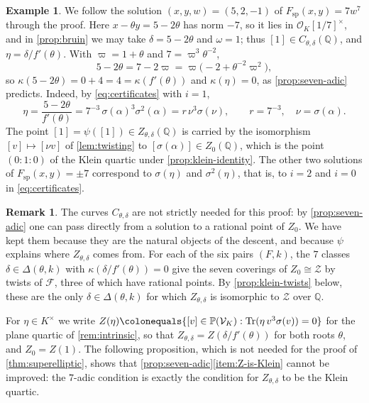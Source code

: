 \documentclass[12pt]{amsart}
\newcommand{\PP}{{\mathbb P}}
\newcommand{\Q}{\mathbb{Q}}
\newcommand{\calF}{{\mathcal F}}
\newcommand{\calV}{{\mathcal V}}
\newcommand{\calZ}{{\mathcal Z}}
\newcommand{\OO}{{\mathcal O}}
\DeclareMathOperator{\spc}{sp}
\DeclareMathOperator{\Tr}{Tr}
\numberwithin{equation}{section}
\theoremstyle{definition}
\newtheorem{example}[theorem]{Example}
\newtheorem{remark}[theorem]{Remark}
\begin{document}
\begin{example}
  \label{ex:five-two}
  We follow the solution $(x,y,w) = (5,2,-1)$ of $F_{\spc}(x,y) = 7w^{7}$ through
  the proof. Here $x - \theta y = 5 - 2\theta$ has norm $-7$, so it lies in
  $\OO_K[1/7]^{\times}$, and in \cref{prop:bruin} we may take $\delta = 5 - 2\theta$ and
  $\omega = 1$; thus $[1] \in C_{\theta,\delta}(\Q)$, and $\eta = \delta/f'(\theta)$.
  With $\varpi = 1 + \theta$ and $7 = \varpi^{3}\theta^{-2}$,
  \[
    5 - 2\theta = 7 - 2\varpi = \varpi\bigl(-2 + \theta^{-2}\varpi^{2}\bigr),
  \]
  so $\kappa(5 - 2\theta) = 0 + 4 = 4 = \kappa(f'(\theta))$ and $\kappa(\eta) = 0$,
  as \cref{prop:seven-adic} predicts. Indeed, by \cref{eq:certificates} with
  $i = 1$,
  \[
    \eta = \frac{5 - 2\theta}{f'(\theta)} = 7^{-3}\,\sigma(\alpha)^{3}\sigma^{2}(\alpha)
    = r\,\nu^{3}\sigma(\nu), \qquad r = 7^{-3},\quad \nu = \sigma(\alpha).
  \]
  The point $[1] = \psi([1]) \in Z_{\theta,\delta}(\Q)$ is carried by the
  isomorphism $[v] \mapsto [\nu v]$ of \cref{lem:twisting} to $[\sigma(\alpha)]
  \in Z_0(\Q)$, which is the point $(0:1:0)$ of the Klein quartic under
  \cref{prop:klein-identity}. The other two solutions of $F_{\spc}(x,y) = \pm 7$
  correspond to $\sigma(\eta)$ and $\sigma^{2}(\eta)$, that is, to $i = 2$ and
  $i = 0$ in \cref{eq:certificates}.
\end{example}

\begin{remark}
  \label{rem:no-C}
  The curves $C_{\theta,\delta}$ are not strictly needed for this proof: by
  \cref{prop:seven-adic} one can pass directly from a solution to a rational
  point of $Z_0$. We have kept them because they are the natural objects of the
  descent, and because $\psi$ explains where $Z_{\theta,\delta}$ comes from.
  For each of the six pairs $(F,k)$, the $7$ classes $\delta \in \Delta(\theta,k)$
  with $\kappa(\delta/f'(\theta)) = 0$ give the seven coverings of $Z_0 \cong
  \calZ$ by twists of $\calF$, three of which have rational points. By
  \cref{prop:klein-twists} below, these are the only $\delta \in \Delta(\theta,k)$
  for which $Z_{\theta,\delta}$ is isomorphic to $\calZ$ over $\Q$.
\end{remark}

For $\eta \in K^{\times}$ we write $Z(\eta) \colonequals \{[v] \in
\PP(\calV_K) : \Tr(\eta\,v^{3}\sigma(v)) = 0\}$ for the plane quartic of
\cref{rem:intrinsic}, so that $Z_{\theta,\delta} = Z(\delta/f'(\theta))$ for
both roots $\theta$, and $Z_0 = Z(1)$. The following proposition, which is not
needed for the proof of \cref{thm:superelliptic}, shows that
\cref{prop:seven-adic}\eqref{item:Z-is-Klein} cannot be improved: the $7$-adic
condition is exactly the condition for $Z_{\theta,\delta}$ to be the Klein
quartic.
\end{document}
